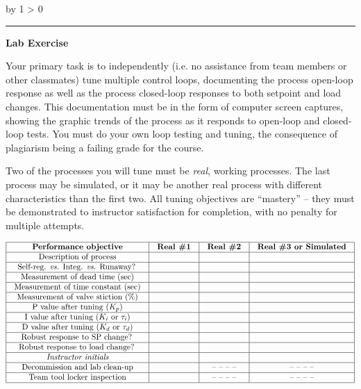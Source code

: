 \documentclass[12pt,a4paper]{article}
\def\oppgave{
            \advance\questnum by 1
            \ifnum \questnum > 0
                 \hrule
                 \vskip 3pt
                 \leftline{Oppgave \the\questnum}
                 \vskip 3pt \fi}
\begin{document}

\vfil \eject 



\oppgave{} 

\noindent
{\bf Lab Exercise}

\vskip 5pt

Your primary task is to independently (i.e. no assistance from team members or other classmates) tune multiple control loops, documenting the process open-loop response as well as the process closed-loop responses to both setpoint and load changes.  This documentation must be in the form of computer screen captures, showing the graphic trends of the process as it responds to open-loop and closed-loop tests.  You must do your own loop testing and tuning, the consequence of plagiarism being a failing grade for the course.

Two of the processes you will tune must be {\it real}, working processes.  The last process may be simulated, or it may be another real process with different characteristics than the first two.  All tuning objectives are ``mastery'' -- they must be demonstrated to instructor satisfaction for completion, with no penalty for multiple attempts.

\vskip 10pt



$$\vbox{\offinterlineskip
\halign{\strut
\vrule \quad\hfil # \ \hfil & 
\vrule \quad\hfil # \ \hfil & 
\vrule \quad\hfil # \ \hfil & 
\vrule \quad\hfil # \ \hfil \vrule \cr
\noalign{\hrule}
%
{\bf Performance objective} & {\bf Real \#1} & {\bf Real \#2} & {\bf Real \#3 or Simulated} \cr
%
\noalign{\hrule}
%
Description of process &  &  &  \cr
%
\noalign{\hrule}
%
Self-reg. {\it vs.} Integ. {\it vs.} Runaway? &  &  &  \cr
%
\noalign{\hrule}
%
Measurement of dead time (sec) &  &  &  \cr
%
\noalign{\hrule}
%
Measurement of time constant (sec) &  &  &  \cr
%
\noalign{\hrule}
%
Measurement of valve stiction (\%) &  &  &  \cr
%
\noalign{\hrule}
%
P value after tuning ($K_p$) &  &  &  \cr
%
\noalign{\hrule}
%
I value after tuning ($K_i$ or $\tau_i$) &  &  &  \cr
%
\noalign{\hrule}
%
D value after tuning ($K_d$ or $\tau_d$) &  &  &  \cr
%
\noalign{\hrule}
%
Robust response to SP change? &  &  &  \cr
%
\noalign{\hrule}
%
Robust response to load change? &  &  &  \cr
%
\noalign{\hrule}
%
{\it Instructor initials} &  &  &  \cr
%
\noalign{\hrule}
%
Decommission and lab clean-up &  & -- -- -- -- & -- -- -- -- \cr
%
\noalign{\hrule}
%
Team tool locker inspection &  & -- -- -- -- & -- -- -- -- \cr
%
\noalign{\hrule}
} %
}$$ %
\end{document}
